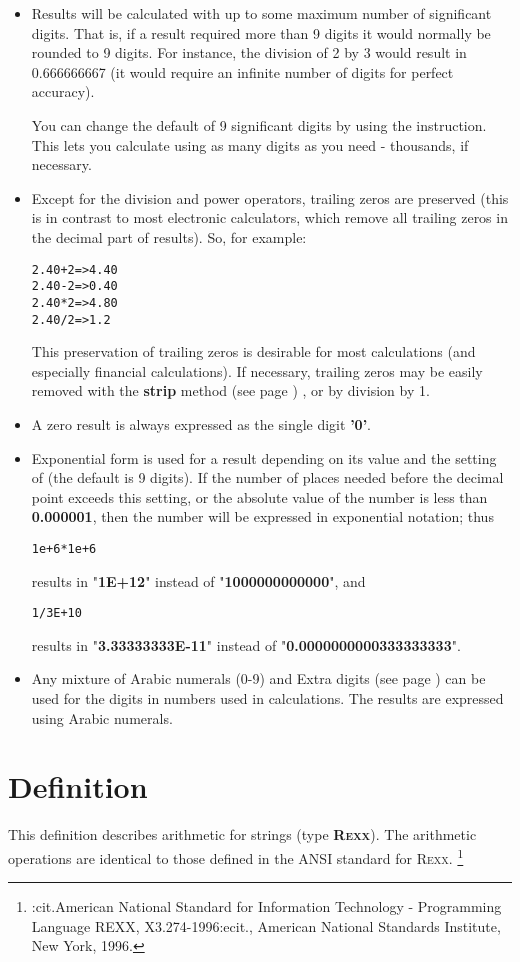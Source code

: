 \begin{itemize}
\item Results will be calculated with up to some maximum number of
significant digits.
That is, if a result required more than 9 digits it would normally be
rounded to 9 digits.
For instance, the division of 2 by 3 would result in 0.666666667 (it
would require an infinite number of digits for perfect accuracy).
 
You can change the default of 9 significant digits by using the
 instruction.  This lets you calculate using
as many digits as you need - thousands, if necessary.
\item Except for the division and power operators, trailing zeros are
preserved (this is in contrast to most electronic calculators, which
remove all trailing zeros in the decimal part of results).
So, for example:
\begin{alltt}
2.40 + 2  =>  4.40
2.40 - 2  =>  0.40
2.40 * 2  =>  4.80
2.40 / 2  =>  1.2
\end{alltt}
This preservation of trailing zeros is desirable for most
calculations (and especially financial calculations).
 If necessary, trailing zeros may be easily removed with the
 \textbf{strip} method (see page \pageref{refstrip}) , or by division by 1.
\item A zero result is always expressed as the single
digit \textbf{'0'}.
\item 
Exponential form is used for a result depending on its value and
the setting of  (the default is 9 digits).
If the number of places needed before the decimal point exceeds this
setting, or the absolute value of the number is less
than \textbf{0.000001}, then the number will be expressed in
exponential notation; thus
\begin{alltt}
1e+6 * 1e+6
\end{alltt}
results in "\textbf{1E+12}" instead of
"\textbf{1000000000000}", and
\begin{alltt}
1 / 3E+10
\end{alltt}
results in "\textbf{3.33333333E-11}" instead of
"\textbf{0.0000000000333333333}".
\item 
Any mixture of Arabic numerals (0-9) and  Extra digits (see page \pageref{refsyms}) 
can be used for the digits in numbers used in calculations.  The results
are expressed using Arabic numerals.
\end{itemize}
\section{Definition}\label{arithdefinition}
 This definition describes arithmetic for \nr{} strings
(type \textbf{R\textsc{exx}}).
The arithmetic operations are identical to those defined in the ANSI
standard for R\textsc{exx}.
\footnote{
:cit.American National Standard for Information Technology -
Programming Language REXX, X3.274-1996:ecit., American National
Standards Institute, New York, 1996.
}
